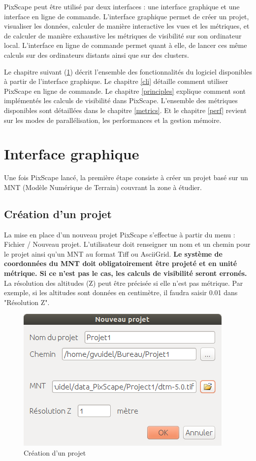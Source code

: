 \documentclass{report}
\begin{document}
PixScape peut être utilisé par deux interfaces : une interface graphique et une interface en ligne de commande.
L'interface graphique permet de créer un projet, visualiser les données, calculer de manière interactive les vues et les métriques, et de calculer de manière exhaustive les métriques de visibilité sur son ordinateur local. L'interface en ligne de commande permet quant à elle, de lancer ces même calculs sur des ordinateurs distants ainsi que sur des clusters.

Le chapitre suivant (\ref{gui}) décrit l'ensemble des fonctionnalités du logiciel disponibles à partir de l'interface graphique. Le chapitre \ref{cli} détaille comment utiliser PixScape en ligne de commande. Le chapitre \ref{principles} explique comment sont implémentés les calculs de visibilité dans PixScape. L'ensemble des métriques disponibles sont détaillées dans le chapitre \ref{metrics}. Et le chapitre \ref{perf} revient sur les modes de parallélisation, les performances et la gestion mémoire.




\chapter{Interface graphique}
\label{gui}

Une fois PixScape lancé, la première étape consiste à créer un projet basé sur un MNT (Modèle Numérique de Terrain) couvrant la zone à étudier.

\section{Création d'un projet}

La mise en place d’un nouveau projet PixScape s’effectue à partir du menu : Fichier / Nouveau projet. L’utilisateur doit renseigner un nom et un chemin pour le projet ainsi qu'un MNT au format Tiff ou AsciiGrid. \textbf{Le système de coordonnées du MNT doit obligatoirement être projeté et en unité métrique. Si ce n'est pas le cas, les calculs de visibilité seront erronés.} La résolution des altitudes (Z) peut être précisée si elle n'est pas métrique. Par exemple, si les altitudes sont données en centimètre, il faudra saisir 0.01 dans "Résolution Z".

\begin{figure}[H]
	\includegraphics[scale=0.5]{img/new_project-fr.png} 
	\caption{Création d'un projet}
\end{figure}
\end{document}
